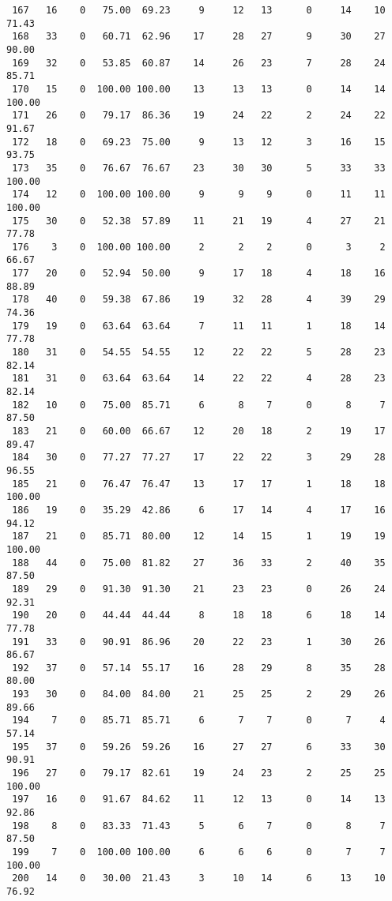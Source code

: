 \begin{verbatim}
 167   16    0   75.00  69.23     9     12   13      0     14    10    71.43
 168   33    0   60.71  62.96    17     28   27      9     30    27    90.00
 169   32    0   53.85  60.87    14     26   23      7     28    24    85.71
 170   15    0  100.00 100.00    13     13   13      0     14    14   100.00
 171   26    0   79.17  86.36    19     24   22      2     24    22    91.67
 172   18    0   69.23  75.00     9     13   12      3     16    15    93.75
 173   35    0   76.67  76.67    23     30   30      5     33    33   100.00
 174   12    0  100.00 100.00     9      9    9      0     11    11   100.00
 175   30    0   52.38  57.89    11     21   19      4     27    21    77.78
 176    3    0  100.00 100.00     2      2    2      0      3     2    66.67
 177   20    0   52.94  50.00     9     17   18      4     18    16    88.89
 178   40    0   59.38  67.86    19     32   28      4     39    29    74.36
 179   19    0   63.64  63.64     7     11   11      1     18    14    77.78
 180   31    0   54.55  54.55    12     22   22      5     28    23    82.14
 181   31    0   63.64  63.64    14     22   22      4     28    23    82.14
 182   10    0   75.00  85.71     6      8    7      0      8     7    87.50
 183   21    0   60.00  66.67    12     20   18      2     19    17    89.47
 184   30    0   77.27  77.27    17     22   22      3     29    28    96.55
 185   21    0   76.47  76.47    13     17   17      1     18    18   100.00
 186   19    0   35.29  42.86     6     17   14      4     17    16    94.12
 187   21    0   85.71  80.00    12     14   15      1     19    19   100.00
 188   44    0   75.00  81.82    27     36   33      2     40    35    87.50
 189   29    0   91.30  91.30    21     23   23      0     26    24    92.31
 190   20    0   44.44  44.44     8     18   18      6     18    14    77.78
 191   33    0   90.91  86.96    20     22   23      1     30    26    86.67
 192   37    0   57.14  55.17    16     28   29      8     35    28    80.00
 193   30    0   84.00  84.00    21     25   25      2     29    26    89.66
 194    7    0   85.71  85.71     6      7    7      0      7     4    57.14
 195   37    0   59.26  59.26    16     27   27      6     33    30    90.91
 196   27    0   79.17  82.61    19     24   23      2     25    25   100.00
 197   16    0   91.67  84.62    11     12   13      0     14    13    92.86
 198    8    0   83.33  71.43     5      6    7      0      8     7    87.50
 199    7    0  100.00 100.00     6      6    6      0      7     7   100.00
 200   14    0   30.00  21.43     3     10   14      6     13    10    76.92

\end{verbatim}
